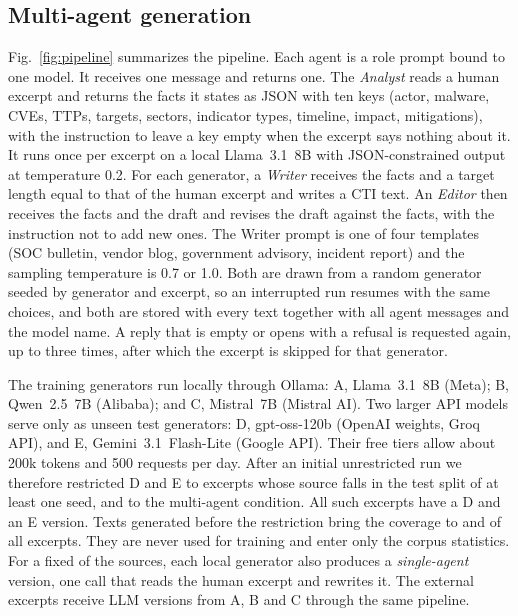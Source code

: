 \documentclass[journal]{IEEEtran}
\begin{document}
\subsection{Multi-agent generation}

Fig.~\ref{fig:pipeline} summarizes the pipeline. Each agent is a role prompt bound to one model. It receives one
message and returns one. The \emph{Analyst} reads a human excerpt and returns the facts it states as JSON with ten
keys (actor, malware, CVEs, TTPs, targets, sectors, indicator types, timeline, impact, mitigations), with the
instruction to leave a key empty when the excerpt says nothing about it. It runs once per excerpt on a local
Llama~3.1~8B with JSON-constrained output at temperature 0.2. For each generator, a \emph{Writer} receives the facts
and a target length equal to that of the human excerpt and writes a CTI text. An \emph{Editor} then receives the
facts and the draft and revises the draft against the facts, with the instruction not to add new ones. The Writer
prompt is one of four templates (SOC bulletin, vendor blog, government advisory, incident report) and the sampling
temperature is 0.7 or 1.0. Both are drawn from a random generator seeded by generator and excerpt, so an
interrupted run resumes with the same choices, and both are stored with every text together with all agent
messages and the model name. A reply that is empty or opens with a refusal is requested again, up to three times,
after which the excerpt is skipped for that generator.

The training generators run locally through Ollama: A, Llama~3.1~8B (Meta); B, Qwen~2.5~7B (Alibaba); and C,
Mistral~7B (Mistral AI). Two larger API models serve only as unseen test generators: D, gpt-oss-120b (OpenAI
weights, Groq API), and E, Gemini~3.1~Flash-Lite (Google API). Their free tiers allow about 200k tokens and 500
requests per day. After an initial unrestricted run we therefore restricted D and E to excerpts whose source falls
in the test split of at least one seed, and to the multi-agent condition. All \NVarChunks{} such excerpts have a D
and an E version. Texts generated before the restriction bring the coverage to \NCoverD{} and \NCoverE{} of all
excerpts. They are never used for training and enter only the corpus statistics. For a fixed \SingleShare{} of the
sources, each local generator also produces a \emph{single-agent} version, one call that reads the human excerpt
and rewrites it. The external excerpts receive LLM versions from A, B and C through the same pipeline.
\end{document}
